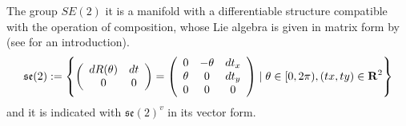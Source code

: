 The group $SE(2)$ it is a manifold with a differentiable structure compatible with the operation of composition, whose Lie algebra is given in matrix form by (see \cite{hall2015lie, gallier2011geometric} for an introduction).
\begin{align*}
\mathfrak{se}(2) := 
\left \{
\left (
\begin{array} {c c }
dR(\theta) & dt \\
0 & 0
\end{array}
\right )
=
\left (
\begin{array} {c c c }
0 & -\theta &  dt_{x} \\
\theta & 0 & dt_{y} \\
0& 0 & 0
\end{array}
\right )
\mid
\theta \in  [0, 2\pi), (tx, ty) \in\mathbf{R}^2
\right \}
\end{align*}
and it is indicated with $\mathfrak{se}(2)^{v}$ in its vector form.\\

